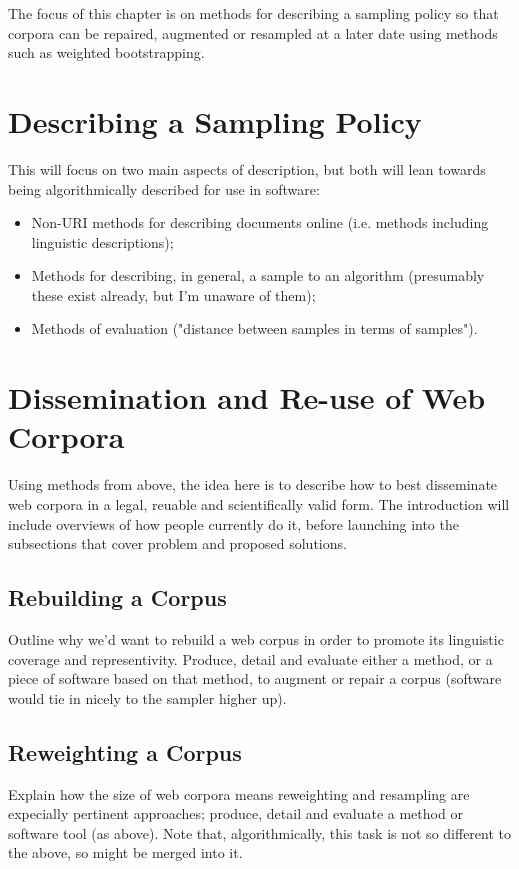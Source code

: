 The focus of this chapter is on methods for describing a sampling policy so that corpora can be repaired, augmented or resampled at a later date using methods such as weighted bootstrapping.

\section{Describing a Sampling Policy}
This will focus on two main aspects of description, but both will lean towards being algorithmically described for use in software:
\begin{itemize}
	\item Non-URI methods for describing documents online (i.e. methods including linguistic descriptions);
	\item Methods for describing, in general, a sample to an algorithm (presumably these exist already, but I'm unaware of them);
	\item Methods of evaluation ("distance between samples in terms of samples").
\end{itemize}



\section{Dissemination and Re-use of Web Corpora}
Using methods from above, the idea here is to describe how to best disseminate web corpora in a legal, reuable and scientifically valid form.  The introduction will include overviews of how people currently do it, before launching into the subsections that cover problem and proposed solutions.

\subsection{Rebuilding a Corpus}
Outline why we'd want to rebuild a web corpus in order to promote its linguistic coverage and representivity.  Produce, detail and evaluate either a method, or a piece of software based on that method, to augment or repair a corpus (software would tie in nicely to the sampler higher up).


\subsection{Reweighting a Corpus}
Explain how the size of web corpora means reweighting and resampling are expecially pertinent approaches; produce, detail and evaluate a method or software tool (as above).  Note that, algorithmically, this task is not so different to the above, so might be merged into it.


